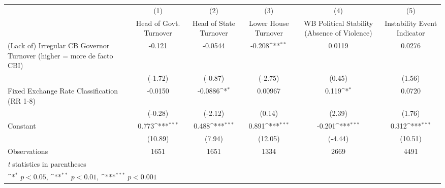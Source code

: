 {
\def\sym#1{\ifmmode^{#1}\else\(^{#1}\)\fi}
\begin{tabular}{l*{5}{c}}
\hline\hline
                &\multicolumn{1}{c}{(1)}&\multicolumn{1}{c}{(2)}&\multicolumn{1}{c}{(3)}&\multicolumn{1}{c}{(4)}&\multicolumn{1}{c}{(5)}\\
                &\multicolumn{1}{c}{Head of Govt. Turnover}&\multicolumn{1}{c}{Head of State Turnover}&\multicolumn{1}{c}{Lower House Turnover}&\multicolumn{1}{c}{WB Political Stability (Absence of Violence)}&\multicolumn{1}{c}{Instability Event Indicator}\\
\hline
(Lack of) Irregular CB Governor Turnover (higher = more de facto CBI)&   -0.121         &  -0.0544         &   -0.208\sym{**} &   0.0119         &   0.0276         \\
                &  (-1.72)         &  (-0.87)         &  (-2.75)         &   (0.45)         &   (1.56)         \\
[1em]
Fixed Exchange Rate Classification (RR 1-8)&  -0.0150         &  -0.0886\sym{*}  &  0.00967         &    0.119\sym{*}  &   0.0720         \\
                &  (-0.28)         &  (-2.12)         &   (0.14)         &   (2.39)         &   (1.76)         \\
[1em]
Constant        &    0.773\sym{***}&    0.488\sym{***}&    0.891\sym{***}&   -0.201\sym{***}&    0.312\sym{***}\\
                &  (10.89)         &   (7.94)         &  (12.05)         &  (-4.44)         &  (10.51)         \\
\hline
Observations    &     1651         &     1651         &     1334         &     2669         &     4491         \\
\hline\hline
\multicolumn{6}{l}{\footnotesize \textit{t} statistics in parentheses}\\
\multicolumn{6}{l}{\footnotesize \sym{*} \(p<0.05\), \sym{**} \(p<0.01\), \sym{***} \(p<0.001\)}\\
\end{tabular}
}
